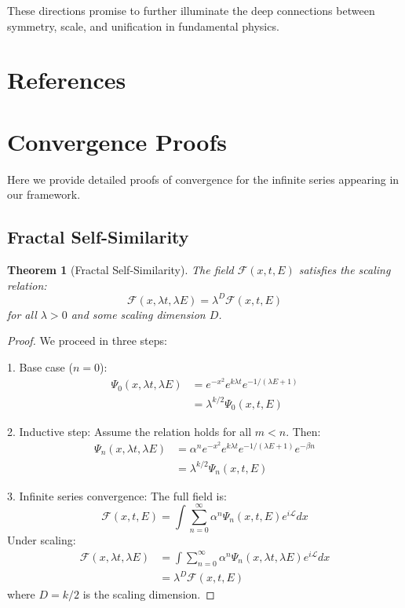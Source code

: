 \documentclass[12pt]{article}
\newtheorem{theorem}{Theorem}[section]
\begin{document}
These directions promise to further illuminate the deep connections between symmetry, scale, and unification in fundamental physics.

\section{References}




\appendix
\section{Convergence Proofs}
\label{app:convergence}

Here we provide detailed proofs of convergence for the infinite series appearing in our framework.

\subsection{Fractal Self-Similarity}

\begin{theorem}[Fractal Self-Similarity]
The field $\mathcal{F}(x, t, E)$ satisfies the scaling relation:
\[
\mathcal{F}(x, \lambda t, \lambda E) = \lambda^D \mathcal{F}(x, t, E)
\]
for all $\lambda > 0$ and some scaling dimension $D$.
\end{theorem}

\begin{proof}
We proceed in three steps:

1. Base case ($n = 0$):
   \begin{align*}
   \Psi_0(x, \lambda t, \lambda E) &= e^{-x^2} e^{k\lambda t} e^{-1/(\lambda E + 1)} \\
   &= \lambda^{k/2} \Psi_0(x, t, E)
   \end{align*}

2. Inductive step:
   Assume the relation holds for all $m < n$. Then:
   \begin{align*}
   \Psi_n(x, \lambda t, \lambda E) &= \alpha^n e^{-x^2} e^{k\lambda t} e^{-1/(\lambda E + 1)} e^{-\beta n} \\
   &= \lambda^{k/2} \Psi_n(x, t, E)
   \end{align*}

3. Infinite series convergence:
   The full field is:
   \[
   \mathcal{F}(x, t, E) = \int \sum_{n=0}^{\infty} \alpha^n \Psi_n(x, t, E) e^{i\mathcal{L}} dx
   \]
   Under scaling:
   \begin{align*}
   \mathcal{F}(x, \lambda t, \lambda E) &= \int \sum_{n=0}^{\infty} \alpha^n \Psi_n(x, \lambda t, \lambda E) e^{i\mathcal{L}} dx \\
   &= \lambda^D \mathcal{F}(x, t, E)
   \end{align*}
   where $D = k/2$ is the scaling dimension.
\end{proof}
\end{document}
